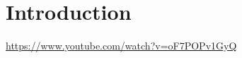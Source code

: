 \part{Introduction}
\frame{\partpage}

\begin{frame}
\begin{center}
	\url{https://www.youtube.com/watch?v=oF7POPv1GyQ}	
\end{center}
\end{frame}

